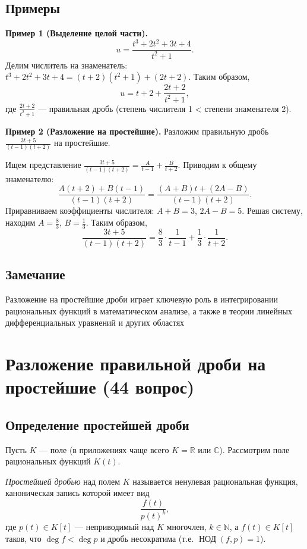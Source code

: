 \documentclass[a4paper,12pt]{article}
\theoremstyle{definition}
\theoremstyle{plain}
\theoremstyle{remark}
\begin{document}
	\subsection{Примеры}
	
	\textbf{Пример 1 (Выделение целой части).}
	\[
	u = \frac{t^3 + 2t^2 + 3t + 4}{t^2 + 1}.
	\]
	Делим числитель на знаменатель: \( t^3 + 2t^2 + 3t + 4 = (t + 2)(t^2 + 1) + (2t + 2) \). Таким образом,
	\[
	u = t + 2 + \frac{2t + 2}{t^2 + 1},
	\]
	где \( \frac{2t+2}{t^2+1} \) — правильная дробь (степень числителя 1 < степени знаменателя 2).
	
	\textbf{Пример 2 (Разложение на простейшие).}
	Разложим правильную дробь \( \frac{3t+5}{(t-1)(t+2)} \) на простейшие.
	
	Ищем представление \( \frac{3t+5}{(t-1)(t+2)} = \frac{A}{t-1} + \frac{B}{t+2} \). Приводим к общему знаменателю:
	\[
	\frac{A(t+2) + B(t-1)}{(t-1)(t+2)} = \frac{(A+B)t + (2A - B)}{(t-1)(t+2)}.
	\]
	Приравниваем коэффициенты числителя: \( A+B = 3 \), \( 2A - B = 5 \). Решая систему, находим \( A = \frac{8}{3} \), \( B = \frac{1}{3} \). Таким образом,
	\[
	\frac{3t+5}{(t-1)(t+2)} = \frac{8}{3}\cdot\frac{1}{t-1} + \frac{1}{3}\cdot\frac{1}{t+2}.
	\]
	
	\subsection{Замечание}
	
	Разложение на простейшие дроби играет ключевую роль в интегрировании рациональных функций в математическом анализе, а также в теории линейных дифференциальных уравнений и других областях
	
	
	
	
	\newpage
	\section{Разложение правильной дроби на простейшие (44 вопрос)}
	
	\subsection{Определение простейшей дроби}
	
	Пусть \( K \) — поле (в приложениях чаще всего \( K = \mathbb{R} \) или \( \mathbb{C} \)). Рассмотрим поле рациональных функций \( K(t) \).
	
	\begin{tcolorbox}[colback=blue!5, colframe=blue!40!black, title=Определение]
		\textit{Простейшей дробью} над полем \( K \) называется ненулевая рациональная функция, каноническая запись которой имеет вид
		\[
		\frac{f(t)}{p(t)^k},
		\]
		где \( p(t) \in K[t] \) — неприводимый над \( K \) многочлен, \( k \in \mathbb{N} \), а \( f(t) \in K[t] \) таков, что \( \deg f < \deg p \) и дробь несократима (т.е. \( \operatorname{НОД}(f, p) = 1 \)).
	\end{tcolorbox}
	
\end{document}
